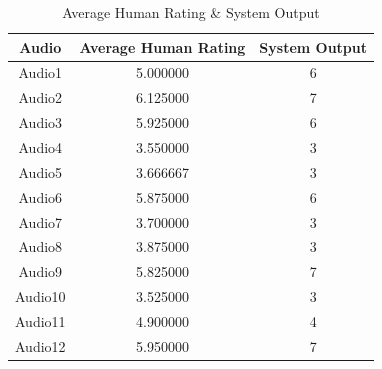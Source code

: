 \documentclass[Arial,12pt,openright,twoside]{book}
\begin{document}
  \begin{table}[h!] %
\centering
\caption{Average Human Rating & System Output}
\label{tab:correlation_table} %
\begin{tabular}{|c|c|c|}
\hline
Audio & Average Human Rating & System Output \\ \hline
Audio1 & 5.000000 & 6 \\ \hline
Audio2 & 6.125000 & 7 \\ \hline
Audio3 & 5.925000 & 6 \\ \hline
Audio4 & 3.550000 & 3 \\ \hline
Audio5 & 3.666667 & 3 \\ \hline
Audio6 & 5.875000 & 6 \\ \hline
Audio7 & 3.700000 & 3 \\ \hline
Audio8 & 3.875000 & 3 \\ \hline
Audio9 & 5.825000& 7 \\ \hline
Audio10 & 3.525000 & 3 \\ \hline
Audio11 & 4.900000& 4 \\ \hline
Audio12 & 5.950000 & 7 \\ \hline
\end{tabular}
\end{table}
\end{document}
